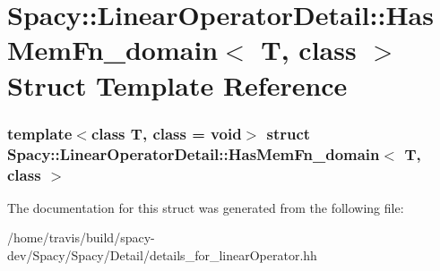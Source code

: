 \hypertarget{structSpacy_1_1LinearOperatorDetail_1_1HasMemFn__domain}{\section{\-Spacy\-:\-:\-Linear\-Operator\-Detail\-:\-:\-Has\-Mem\-Fn\-\_\-domain$<$ \-T, class $>$ \-Struct \-Template \-Reference}
\label{structSpacy_1_1LinearOperatorDetail_1_1HasMemFn__domain}
}
\subsubsection*{template$<$class T, class = void$>$ struct Spacy\-::\-Linear\-Operator\-Detail\-::\-Has\-Mem\-Fn\-\_\-domain$<$ T, class $>$}



\-The documentation for this struct was generated from the following file\-:\begin{DoxyCompactItemize}
\item 
/home/travis/build/spacy-\/dev/\-Spacy/\-Spacy/\-Detail/details\-\_\-for\-\_\-linear\-Operator.\-hh\end{DoxyCompactItemize}
